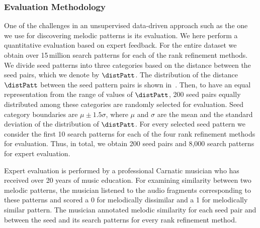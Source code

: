 

\subsubsection{Evaluation Methodology}
\label{sec:evaluationmethodology}

One of the challenges in an unsupervised data-driven approach such as the one we use for discovering melodic patterns is its evaluation. We here perform a quantitative evaluation based on expert feedback. For the entire dataset we obtain over 15\,million search patterns for each of the rank refinement methods. We divide seed patterns into three categories based on the distance between the seed pairs, which we denote by $\distPatt$. The distribution of the distance $\distPatt$ between the seed pattern pairs is shown in~. Then, to have an equal representation from the range of values of $\distPatt$, 200 seed pairs equally distributed among these categories are randomly selected for evaluation. Seed category boundaries are $\mu \pm 1.5\sigma$, where $\mu$ and $\sigma$ are the mean and the standard deviation of the distribution of $\distPatt$. For every selected seed pattern we consider the first 10 search patterns for each of the four rank refinement methods for evaluation. Thus, in total, we obtain 200 seed pairs and 8,000 search patterns for expert evaluation.

Expert evaluation is performed by a professional Carnatic musician who has received over 20 years of music education. For examining similarity between two melodic patterns, the musician listened to the audio fragments corresponding to these patterns and scored a 0 for melodically dissimilar and a 1 for melodically similar pattern. The musician annotated melodic similarity for each seed pair and between the seed and its search patterns for every rank refinement method.


